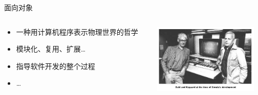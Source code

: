 \documentclass[]{beamer}
\begin{document}
\begin{frame}{面向对象}
  \begin{columns}
    \begin{column}{.5\textwidth}
      \begin{itemize}
        \item 一种用计算机程序表示物理世界的哲学
          \pause
        \item 模块化、复用、扩展\dots
          \pause
        \item 指导软件开发的整个过程
        \item \dots
      \end{itemize}
    \end{column}
    \begin{column}{.5\textwidth}
      \includegraphics[width=5cm]{dahl_nygaard.jpg}
    \end{column}
  \end{columns}
\end{frame}
\end{document}
